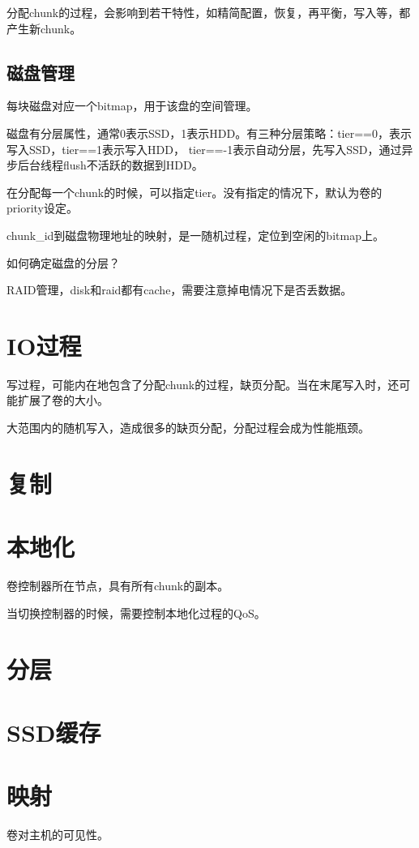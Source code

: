 分配chunk的过程，会影响到若干特性，如精简配置，恢复，再平衡，写入等，都产生新chunk。

\subsection{磁盘管理}

每块磁盘对应一个bitmap，用于该盘的空间管理。

磁盘有分层属性，通常0表示SSD，1表示HDD。有三种分层策略：tier==0，表示写入SSD，tier==1表示写入HDD，
tier==-1表示自动分层，先写入SSD，通过异步后台线程flush不活跃的数据到HDD。

在分配每一个chunk的时候，可以指定tier。没有指定的情况下，默认为卷的priority设定。

chunk\_id到磁盘物理地址的映射，是一随机过程，定位到空闲的bitmap上。

如何确定磁盘的分层？

RAID管理，disk和raid都有cache，需要注意掉电情况下是否丢数据。

\section{IO过程}

写过程，可能内在地包含了分配chunk的过程，缺页分配。当在末尾写入时，还可能扩展了卷的大小。

大范围内的随机写入，造成很多的缺页分配，分配过程会成为性能瓶颈。

\section{复制}

\section{本地化}

卷控制器所在节点，具有所有chunk的副本。

当切换控制器的时候，需要控制本地化过程的QoS。

\section{分层}

\section{SSD缓存}

\section{映射}

卷对主机的可见性。
